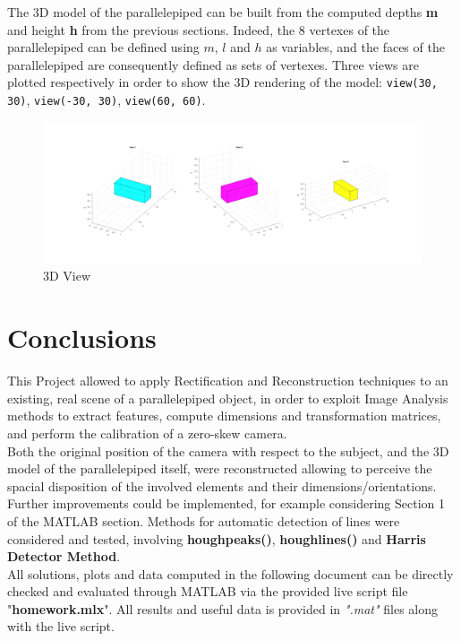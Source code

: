 \documentclass{Configuration_Files/PoliMi3i_thesis}
\begin{document}
The 3D model of the parallelepiped can be built from the computed depths \textbf{m} and height \textbf{h} from the previous sections. Indeed, the 8 vertexes of the parallelepiped can be defined using $m$, $l$ and $h$ as variables, and the faces of the parallelepiped are consequently defined as sets of vertexes.
Three views are plotted respectively in order to show the 3D rendering of the model: \texttt{view(30, 30)}, \texttt{view(-30, 30)}, \texttt{view(60, 60)}.

\begin{figure}[H]
    \centering
    \includegraphics[width=1\linewidth]{Project Template/Images/3dview.png}
    \caption{3D View}
    \label{fig:enter-label}
\end{figure}

\chapter{Conclusions}
This Project allowed to apply Rectification and Reconstruction techniques to an existing, real scene of a parallelepiped object, in order to exploit Image Analysis methods to extract features, compute dimensions and transformation matrices, and perform the calibration of a zero-skew camera.\\
Both the original position of the camera with respect to the subject, and the 3D model of the parallelepiped itself, were reconstructed allowing to perceive the spacial disposition of the involved elements and their dimensions/orientations.
Further improvements could be implemented, for example considering Section 1 of the MATLAB section. Methods for automatic detection of lines were considered and tested, involving \textbf{houghpeaks()}, \textbf{houghlines()} and \textbf{Harris Detector Method}.\\
All solutions, plots and data computed in the following document can be directly checked and evaluated through MATLAB via the provided live script file "\textbf{homework.mlx}". All results and useful data is provided in \textit{".mat"} files along with the live script.
\end{document}
